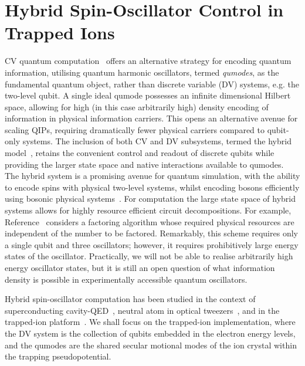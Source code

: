 \section{\textbf{Hybrid Spin-Oscillator Control in Trapped Ions}}
\label{sec:CVQC}
CV quantum computation~\cite{lloyd_quantum_1999} offers an alternative strategy for encoding quantum information, utilising
quantum harmonic oscillators, termed \emph{qumodes},
as the fundamental quantum object, rather than discrete variable (DV) systems, e.g. the two-level qubit. A single ideal qumode possesses an infinite dimensional Hilbert space, allowing for high (in this case arbitrarily high) density encoding of information in physical information carriers. This opens an alternative avenue for scaling QIPs, requiring dramatically fewer physical carriers compared to qubit-only systems. The inclusion of both CV and DV subsystems, termed the hybrid model~\cite{liu_hybrid_2026}, retains the convenient control and readout of discrete qubits while providing the larger state space and native interactions available to qumodes. The hybrid system is a promising avenue for quantum simulation, with the ability to encode spins with physical two-level systems, whilst encoding bosons efficiently using bosonic physical systems~\cite{saner_aharonovbohm_2026, crane_hybrid_2024}.
For computation the large state space of hybrid systems allows for highly
resource efficient circuit decompositions. For example,
Reference~\cite{brenner_factoring_2025} considers a factoring algorithm whose
required physical resources are independent of the number to be factored.
Remarkably, this scheme requires only a single qubit and three oscillators;
however, it requires prohibitively large energy states of the oscillator.
Practically, we will not be able to realise arbitrarily high energy oscillator states, but it is still an open question of what information density is possible in experimentally accessible quantum oscillators.

Hybrid spin-oscillator computation has been studied in the context of
superconducting cavity-QED~\cite{hillmann_universal_2020, blais_circuit_2021,
majer_coupling_2007, pan_continuous-variable_2023, eickbusch_fast_2022}, neutral
atom in optical tweezers~\cite{kaufman_cooling_2012,lienhard_generation_2025,
hwang_hybrid_2026}, and in the trapped-ion
platform~\cite{sutherland_universal_2021,gan_hybrid_2020,fluhmann_encoding_2019}.
We shall focus on the trapped-ion implementation, where the DV system is the collection of qubits embedded in the electron energy levels, and the qumodes are the shared secular motional modes of the ion crystal within the trapping pseudopotential.

